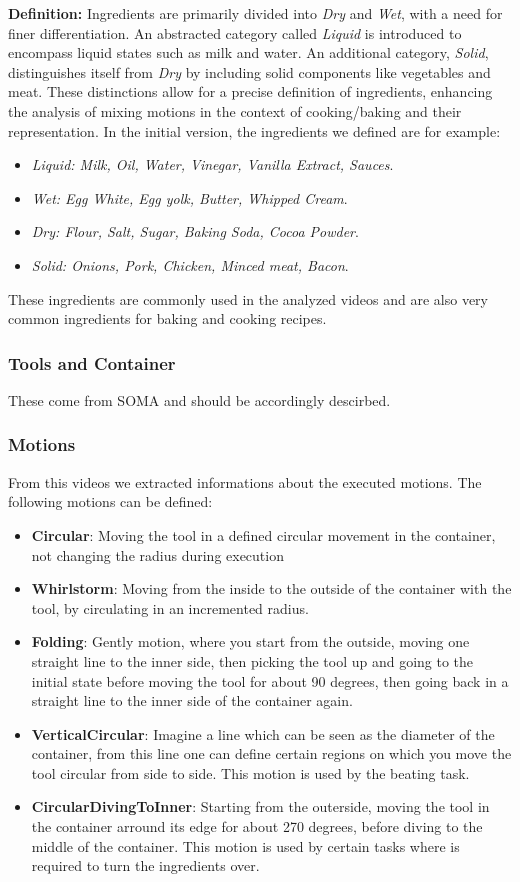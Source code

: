 \textbf{Definition:}
Ingredients are primarily divided into \textit{Dry} and \textit{Wet}, with a need for finer differentiation. An abstracted category called \textit{Liquid} is introduced to encompass liquid states such as milk and water. An additional category, \textit{Solid}, distinguishes itself from \textit{Dry} by including solid components like vegetables and meat. These distinctions allow for a precise definition of ingredients, enhancing the analysis of mixing motions in the context of cooking/baking and their representation.
In the initial version, the ingredients we defined are for example:
\begin{itemize}
  \item \textit{Liquid: Milk, Oil, Water, Vinegar, Vanilla Extract, Sauces}.
  \item \textit{Wet: Egg White, Egg yolk, Butter, Whipped Cream}.
  \item \textit{Dry: Flour, Salt, Sugar, Baking Soda, Cocoa Powder}.
  \item \textit{Solid: Onions, Pork, Chicken, Minced meat, Bacon}.
\end{itemize}
These ingredients are commonly used in the analyzed videos and are also very common ingredients for baking and cooking recipes.


\subsubsection*{Tools and Container}
These come from SOMA and should be accordingly descirbed.

\subsubsection*{Motions}
	From this videos we extracted informations about the executed motions. The following motions can be defined:
	\begin{itemize}
		\item \textbf{Circular}: Moving the tool in a defined circular movement in the container, not changing the radius during execution
		\item \textbf{Whirlstorm}: Moving from the inside to the outside of the container with the tool, by circulating in an incremented radius.
		\item \textbf{Folding}: Gently motion, where you start from the outside, moving one straight line to the inner side, then picking the tool up and going to the initial state before moving the tool for about 90 degrees, then going back in a straight line to the inner side of the container again.
		\item \textbf{VerticalCircular}: Imagine a line which can be seen as the diameter of the container, from this line one can define certain regions on which you move the tool circular from side to side. This motion is used by the beating task.
		\item \textbf{CircularDivingToInner}: Starting from the outerside, moving the tool in the container arround its edge for about 270 degrees, before diving to the middle of the container. This motion is used by certain tasks where is required to turn the ingredients over.
	\end{itemize}

